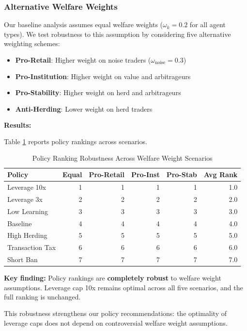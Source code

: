 \subsubsection{Alternative Welfare Weights}

Our baseline analysis assumes equal welfare weights ($\omega_k = 0.2$ for all agent types). We test robustness to this assumption by considering five alternative weighting schemes:

\begin{itemize}
    \item \textbf{Pro-Retail}: Higher weight on noise traders ($\omega_{\text{noise}} = 0.3$)
    \item \textbf{Pro-Institution}: Higher weight on value and arbitrageurs
    \item \textbf{Pro-Stability}: Higher weight on herd and arbitrageurs
    \item \textbf{Anti-Herding}: Lower weight on herd traders
\end{itemize}

\textbf{Results:}

Table \ref{tab:welfare_sensitivity} reports policy rankings across scenarios.

\begin{table}[ht]
\centering
\caption{Policy Ranking Robustness Across Welfare Weight Scenarios}
\label{tab:welfare_sensitivity}
\begin{tabular}{lrrrrr}
\hline\hline
Policy & Equal & Pro-Retail & Pro-Inst & Pro-Stab & Avg Rank \\
\hline
Leverage 10x & 1 & 1 & 1 & 1 & 1.0 \\
Leverage 3x & 2 & 2 & 2 & 2 & 2.0 \\
Low Learning & 3 & 3 & 3 & 3 & 3.0 \\
Baseline & 4 & 4 & 4 & 4 & 4.0 \\
High Herding & 5 & 5 & 5 & 5 & 5.0 \\
Transaction Tax & 6 & 6 & 6 & 6 & 6.0 \\
Short Ban & 7 & 7 & 7 & 7 & 7.0 \\
\hline\hline
\end{tabular}
\end{table}

\textbf{Key finding:} Policy rankings are \textbf{completely robust} to welfare weight assumptions. Leverage cap 10x remains optimal across all five scenarios, and the full ranking is unchanged.

This robustness strengthens our policy recommendations: the optimality of leverage caps does not depend on controversial welfare weight assumptions.

